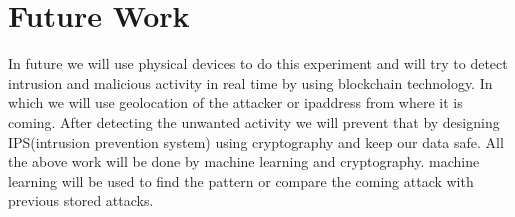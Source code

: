 \chapter{Future Work}

In future we will use physical devices to do this experiment and will try to detect intrusion and malicious activity in real time by using blockchain technology. In which we will use geolocation of the attacker or ipaddress from where it is coming. After detecting the unwanted activity we will prevent that by designing IPS(intrusion prevention system) using cryptography and keep our data safe.
All the above work will be done by machine learning and cryptography. machine learning will be used to find the pattern or compare the coming attack with previous stored attacks.
